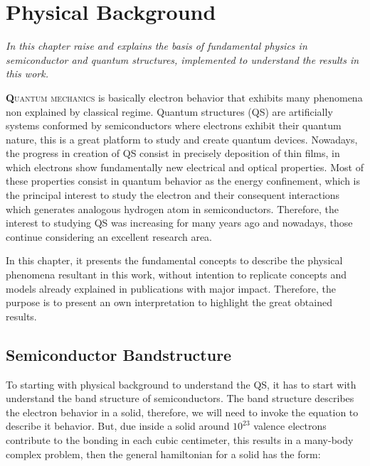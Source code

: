 \chapter{Physical Background }
\label{chapter:Introduction}
\textit{In this chapter raise and explains the basis of  fundamental physics in semiconductor and quantum structures, implemented  to understand the results in this work.}
\vfill
\minitoc
\newpage

\lettrine[lines=3, lraise=.1, nindent=0mm, slope=0mm]{\textbf{Q}}{uantum mechanics}  is basically electron behavior that exhibits many phenomena non explained by classical regime. Quantum structures (QS) are artificially systems conformed by semiconductors where electrons exhibit their quantum nature, this is a great platform to study and create quantum devices. Nowadays, the progress in creation of QS consist in precisely deposition of thin films, in which electrons show fundamentally new electrical and optical properties\cite{sundram1991structures}. Most of these properties consist in quantum behavior  as the energy confinement, which is the principal interest to study the electron and their consequent interactions which generates analogous  hydrogen atom in semiconductors. Therefore, the interest to studying QS was increasing for many years ago and nowadays, those continue considering an excellent research area.  

In this chapter, it presents the fundamental concepts to describe the physical  phenomena resultant in this work, without intention to replicate concepts and models already explained in publications with major impact. Therefore, the purpose is to present an own interpretation to highlight the great obtained results.

\section{Semiconductor Bandstructure}
\label{sec:chapter-1-semiconductor}
\vspace{-10mm}
To starting with physical background to understand the QS, it has to start with understand the  band structure of semiconductors. The band structure describes the electron behavior in a solid, therefore, we will need to invoke the \sch equation to describe it behavior. But, due inside a solid around $10^{23}$ valence electrons contribute to the bonding in each cubic centimeter, this results in a many-body complex problem\cite{piprek2017handbook}, then the general hamiltonian for a solid has the form\cite{alloul2010introduction,cardona2005fundamentals}: 


